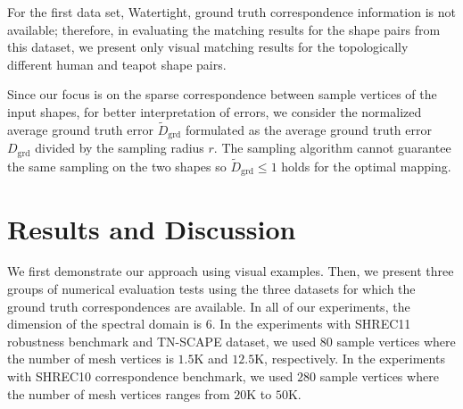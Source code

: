 For the first data set, Watertight, ground truth correspondence information is not available; therefore, in evaluating the matching results for the shape pairs from this dataset, we present only visual matching results for the topologically different human and teapot shape pairs.

Since our focus is on the sparse correspondence between sample vertices of the input shapes, for better interpretation of errors, we consider the normalized average ground truth error ${\widetilde{D}_{\mathrm{grd}}}$ formulated as the average ground truth error $D_{\mathrm{grd}}$ divided by the sampling radius $r$. The sampling algorithm cannot guarantee the same sampling on the two shapes so ${\widetilde{D}_{\mathrm{grd}}} \le 1$ holds for the optimal mapping.


\section{Results and Discussion}
\label{sec:results}
\noindent We first demonstrate our approach using visual examples. Then, we present three groups of numerical evaluation tests using the three datasets for which the ground truth correspondences are available.  In all of our experiments, the dimension of the spectral domain is $6$. {In the experiments with SHREC11 robustness benchmark and TN-SCAPE dataset, we used $80$ sample vertices where the number of mesh vertices is $1.5$K and $12.5$K, respectively. In the experiments with SHREC10 correspondence benchmark, we used $280$ sample vertices where the number of mesh vertices ranges from $20$K to $50$K.}

